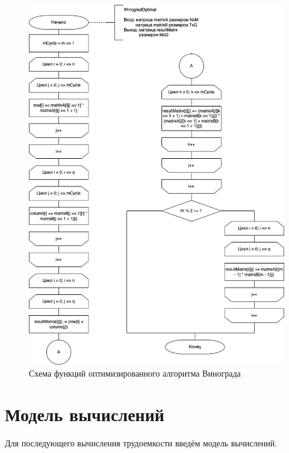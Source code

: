 \begin{figure}[ht!]
	\centering
	\includegraphics[scale=0.65]{img/WinogradOptimal.png}
	\caption{Схема функций оптимизированного алгоритма Винограда}
	\label{fig:mpr}
\end{figure}

\section{Модель вычислений}

Для последующего вычисления трудоемкости введём модель вычислений.

